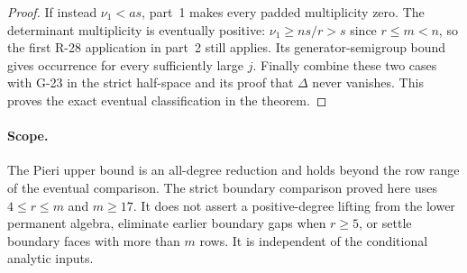 \begin{proof}
If instead $\nu_1<as$, part~1 makes every padded multiplicity
zero. The determinant multiplicity is eventually positive:
$\nu_1\ge ns/r>s$ since $r\le m<n$, so the first R-28
application in part~2 still applies. Its generator-semigroup
bound gives occurrence for every sufficiently large $j$.
Finally combine these two cases with G-23 in the strict
half-space and its proof that $\Delta$ never vanishes. This
proves the exact eventual classification in the theorem.
\end{proof}

\paragraph{Scope.}
The Pieri upper bound is an all-degree reduction and holds
beyond the row range of the eventual comparison. The strict
boundary comparison proved here uses $4\le r\le m$ and
$m\ge17$. It does not assert a positive-degree lifting from
the lower permanent algebra, eliminate earlier boundary gaps
when $r\ge5$, or settle boundary faces with more than $m$
rows. It is independent of the conditional analytic inputs.
